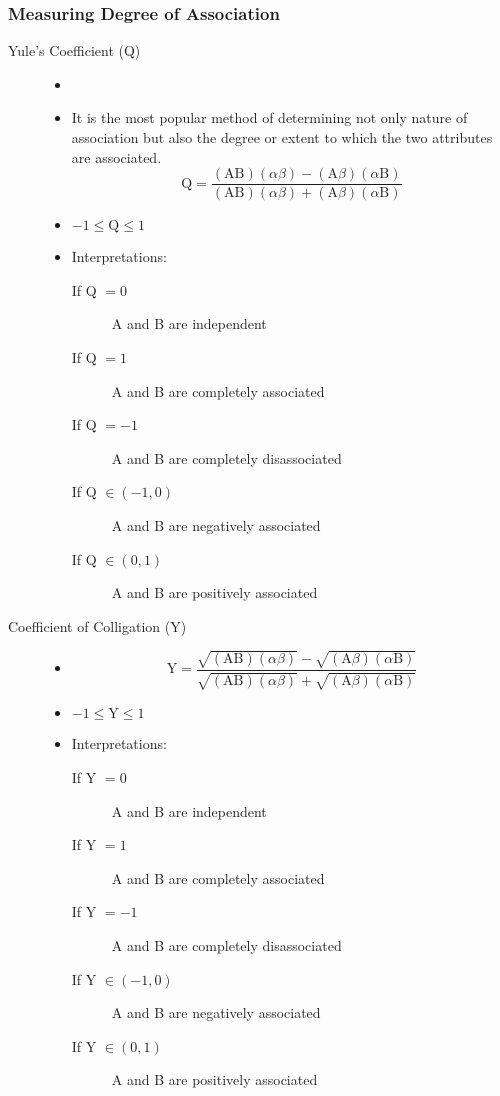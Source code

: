 \documentclass[
10pt, %
a4paper, %
]{report}
\begin{document}
\subsubsection{Measuring Degree of Association}
\begin{description}
\item[Yule's Coefficient (Q)]
\begin{itemize}
\item[]
\item It is the most popular method of determining not only nature of association but also the degree or extent to which the two attributes are associated.
\[
\text{Q} = \frac{(\text{AB})(\alpha\beta) - (\text{A}\beta)(\alpha \text{B})}{(\text{AB})(\alpha\beta) + (\text{A}\beta)(\alpha \text{B})}
\]
\item \(-1 \le \text{Q} \le 1\)
\item Interpretations:
\begin{description}
\item[If Q \(=0\)] \item[] A and B are independent
\item[If Q \(=1\)] \item[] A and B are completely associated
\item[If Q \(=-1\)] \item[] A and B are completely disassociated
\item[If Q \(\in (-1, 0)\)] \item[] A and B are negatively associated
\item[If Q \(\in (0, 1)\)] \item[] A and B are positively associated
\end{description}
\end{itemize}
\item[Coefficient of Colligation (Y)]
\begin{itemize}
\item[]
\[
\text{Y} = \frac{\sqrt{(\text{AB})(\alpha\beta)} - \sqrt{(\text{A}\beta)(\alpha \text{B})}}{\sqrt{(\text{AB})(\alpha\beta)} + \sqrt{(\text{A}\beta)(\alpha \text{B})}}
\]
\item \(-1 \le \text{Y} \le 1\)
\item Interpretations:
\begin{description}
\item[If Y \(=0\)] \item[] A and B are independent
\item[If Y \(=1\)] \item[] A and B are completely associated
\item[If Y \(=-1\)] \item[] A and B are completely disassociated
\item[If Y \(\in (-1, 0)\)] \item[] A and B are negatively associated
\item[If Y \(\in (0, 1)\)] \item[] A and B are positively associated
\end{description}
\end{itemize}
\end{description}
\end{document}
